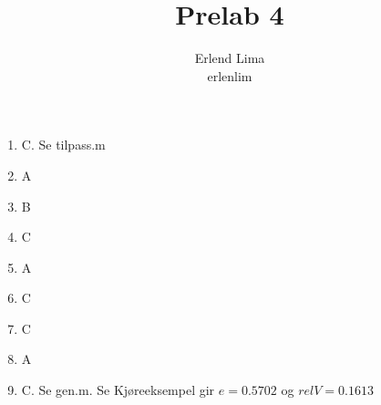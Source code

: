 \documentclass[a4paper,11pt, norsk, twoside]{article}
\title{Prelab 4} \author{Erlend Lima\\ erlenlim}
\begin{document}
\maketitle
{}
\begin{enumerate}[1.]
\item C. Se \textrm{tilpass.m}
\item A
\item B
\item C
\item A
\item C
\item C
\item A
\item C. Se gen.m. Se Kjøreeksempel gir \(e = 0.5702\) og \(relV = 0.1613\)
\end{enumerate}
\end{document}
